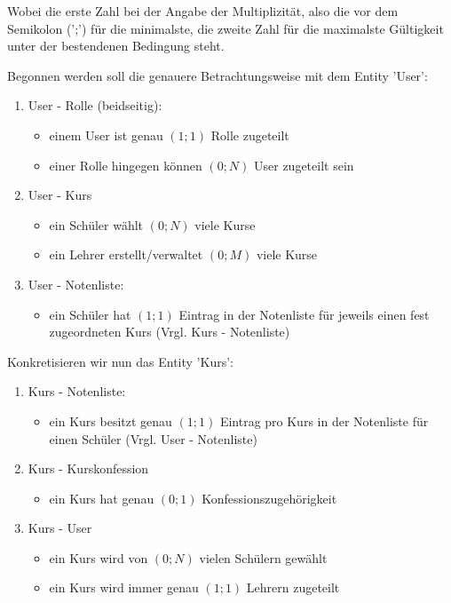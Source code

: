 \documentclass[12pt, twoside, a4paper, ngerman]{article}
\begin{document}
Wobei die erste Zahl bei der Angabe der Multiplizität, also die vor dem Semikolon (';') für die minimalste, die zweite Zahl für die maximalste Gültigkeit unter der bestendenen Bedingung steht.

Begonnen werden soll die genauere Betrachtungsweise mit dem Entity 'User':

\begin{enumerate}
  \item User - Rolle (beidseitig):	
    \begin{itemize}
      \item einem User ist genau $(1;1)$ Rolle zugeteilt
      \item einer Rolle hingegen können $(0;N)$ User zugeteilt sein
    \end{itemize}

  \item User - Kurs
    \begin{itemize}
      \item ein Schüler wählt $(0;N)$ viele Kurse
      \item ein Lehrer erstellt/verwaltet $(0;M)$ viele Kurse
    \end{itemize}
  
  \item User - Notenliste:
    \begin{itemize}
      \item ein Schüler hat $(1;1)$ Eintrag in der Notenliste für jeweils einen fest zugeordneten Kurs (Vrgl. Kurs - Notenliste)
    \end{itemize}

\end{enumerate}

Konkretisieren wir nun das Entity 'Kurs':

\begin{enumerate}
  \item Kurs - Notenliste:
  \begin{itemize}
    \item ein Kurs besitzt genau $(1;1)$ Eintrag pro Kurs in der Notenliste für einen Schüler (Vrgl. User - Notenliste)
  \end{itemize}
  
  \item Kurs - Kurskonfession	
    \begin{itemize}
      \item ein Kurs hat genau $(0;1)$ Konfessionszugehörigkeit
    \end{itemize}

  \item Kurs - User	
    \begin{itemize}
      \item ein Kurs wird von $(0;N)$ vielen Schülern gewählt
      \item ein Kurs wird immer genau $(1;1)$ Lehrern zugeteilt
    \end{itemize}
\end{enumerate}
\end{document}
